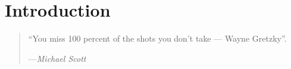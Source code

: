 \cleartoverso
\backgroundtrue
\cleartorecto

\chapter{Introduction}

\clearpage
\backgroundfalse

\blindtext

\begin{quotation}
  ``You miss 100 percent of the shots you don't take --- Wayne Gretzky''.

  ---\emph{Michael Scott}
\end{quotation}

\blindtext